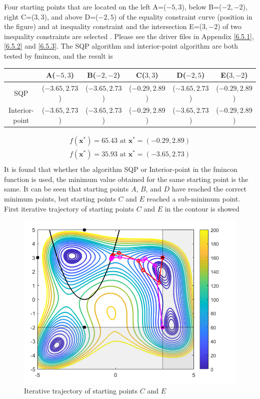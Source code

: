 Four starting points that are located on the left A=($-5,3$), below B=($-2,-2$), right C=($3,3$), and above D=($-2,5$) of the equality constraint curve (position in the figure) and at inequality constraint and the intersection E=($3,-2$) of two inequality constraints are selected . Please see the driver files in Appendix \ref{6.5.1}, \ref{6.5.2} and \ref{6.5.3}. The SQP algorithm and interior-point algorithm are both tested by fmincon, and the result is 
\begin{table}[!htbp]
\centering
\begin{tabular}{|c|c|c|c|c|c|}
\hline
&A($-5,3$)&B($-2,-2$)&C($3,3$)&D($-2,5$)&E($3,-2$)\\
\hline
SQP&($-3.65,2.73$)&($-3.65,2.73$)&($-0.29,2.89$)&($-3.65,2.73$)&($-0.29,2.89$)\\
\hline
Interior-point&($-3.65,2.73$)&($-3.65,2.73$)&($-0.29,2.89$)&($-3.65,2.73$)&($-0.29,2.89$)\\
\hline
\end{tabular}
\end{table}
$$\begin{array}{l}
f\left(\mathbf{x}^{*}\right)=65.43 \text { at } \mathbf{x}^{*}=(-0.29,2.89) \\
f\left(\mathbf{x}^{*}\right)=35.93 \text { at } \mathbf{x}^{*}=(-3.65,2.73) \\
\end{array}$$
It is found that whether the algorithm SQP or Interior-point in the fmincon function is used, the minimum value obtained for the same starting point is the same. It can be seen that starting points $A$, $B$, and $D$ have reached the correct minimum points, but starting points $C$ and $E$ reached a sub-minimum point.\\
First iterative trajectory of starting points $C$ and $E$ in the contour is showed 
\begin{figure}[H]
\centering
\includegraphics[scale=0.5]{figures/fmincon_CE.PNG}
\caption{Iterative trajectory of starting points $C$ and $E$}
\label{fig:labe5.4.3}
\end{figure}
